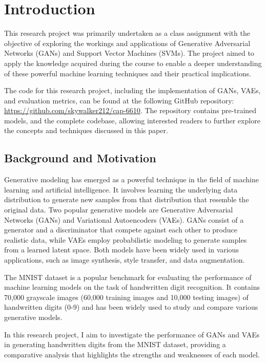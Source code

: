 \documentclass{article}
\begin{document}
\section{Introduction}
This research project was primarily undertaken as a class assignment with the objective of exploring the workings and applications of Generative Adversarial Networks (GANs) and Support Vector Machines (SVMs). The project aimed to apply the knowledge acquired during the course to enable a deeper understanding of these powerful machine learning techniques and their practical implications.

The code for this research project, including the implementation of GANs, VAEs, and evaluation metrics, can be found at the following GitHub repository: \url{https://github.com/skywalker212/cap-6610}. The repository contains pre-trained models, and the complete codebase, allowing interested readers to further explore the concepts and techniques discussed in this paper.

\subsection{Background and Motivation}
Generative modeling has emerged as a powerful technique in the field of machine learning and artificial intelligence. It involves learning the underlying data distribution to generate new samples from that distribution that resemble the original data. Two popular generative models are Generative Adversarial Networks (GANs) and Variational Autoencoders (VAEs). GANs consist of a generator and a discriminator that compete against each other to produce realistic data, while VAEs employ probabilistic modeling to generate samples from a learned latent space. Both models have been widely used in various applications, such as image synthesis, style transfer, and data augmentation.

The MNIST dataset is a popular benchmark for evaluating the performance of machine learning models on the task of handwritten digit recognition. It contains 70,000 grayscale images (60,000 training images and 10,000 testing images) of handwritten digits (0-9) and has been widely used to study and compare various generative models. 

In this research project, I aim to investigate the performance of GANs and VAEs in generating handwritten digits from the MNIST dataset, providing a comparative analysis that highlights the strengths and weaknesses of each model.
\end{document}
